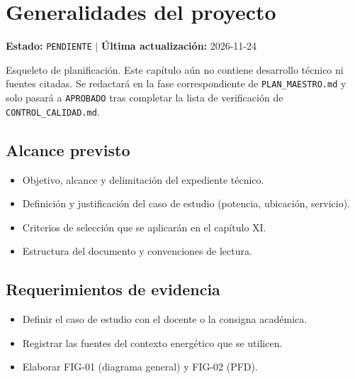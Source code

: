 \chapter{Generalidades del proyecto}
\label{cap:01}

\begin{cajaestado}
\textbf{Estado:} \texttt{PENDIENTE} \quad$|$\quad
\textbf{Última actualización:} 2026-11-24

Esqueleto de planificación. Este capítulo aún no contiene desarrollo técnico ni
fuentes citadas. Se redactará en la fase correspondiente de
\texttt{PLAN\_MAESTRO.md} y solo pasará a \texttt{APROBADO} tras completar
la lista de verificación de \texttt{CONTROL\_CALIDAD.md}.
\end{cajaestado}

\section{Alcance previsto}
\begin{itemize}
  \item Objetivo, alcance y delimitación del expediente técnico.
  \item Definición y justificación del caso de estudio (potencia, ubicación, servicio).
  \item Criterios de selección que se aplicarán en el capítulo XI.
  \item Estructura del documento y convenciones de lectura.
\end{itemize}

\section{Requerimientos de evidencia}
\begin{itemize}
  \item Definir el caso de estudio con el docente o la consigna académica.
  \item Registrar las fuentes del contexto energético que se utilicen.
  \item Elaborar FIG-01 (diagrama general) y FIG-02 (PFD).
\end{itemize}
